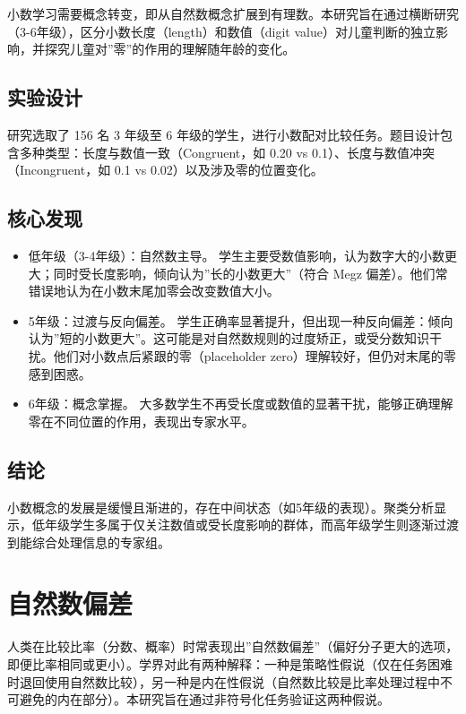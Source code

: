 小数学习需要概念转变，即从自然数概念扩展到有理数。本研究旨在通过横断研究（3-6年级），区分小数长度（length）和数值（digit value）对儿童判断的独立影响，并探究儿童对”零”的作用的理解随年龄的变化。

\subsection{实验设计}

研究选取了 156 名 3 年级至 6 年级的学生，进行小数配对比较任务。题目设计包含多种类型：长度与数值一致（Congruent，如 0.20 vs 0.1）、长度与数值冲突（Incongruent，如 0.1 vs 0.02）以及涉及零的位置变化。

\subsection{核心发现}

\begin{itemize}
    \item 低年级（3-4年级）：自然数主导。 学生主要受数值影响，认为数字大的小数更大；同时受长度影响，倾向认为”长的小数更大”（符合 Megz 偏差）。他们常错误地认为在小数末尾加零会改变数值大小。
    \item 5年级：过渡与反向偏差。 学生正确率显著提升，但出现一种反向偏差：倾向认为”短的小数更大”。这可能是对自然数规则的过度矫正，或受分数知识干扰。他们对小数点后紧跟的零（placeholder zero）理解较好，但仍对末尾的零感到困惑。
    \item 6年级：概念掌握。 大多数学生不再受长度或数值的显著干扰，能够正确理解零在不同位置的作用，表现出专家水平。
\end{itemize}

\subsection{结论}

小数概念的发展是缓慢且渐进的，存在中间状态（如5年级的表现）。聚类分析显示，低年级学生多属于仅关注数值或受长度影响的群体，而高年级学生则逐渐过渡到能综合处理信息的专家组。

\section{自然数偏差}

人类在比较比率（分数、概率）时常表现出”自然数偏差”（偏好分子更大的选项，即便比率相同或更小）。学界对此有两种解释：一种是策略性假说（仅在任务困难时退回使用自然数比较），另一种是内在性假说（自然数比较是比率处理过程中不可避免的内在部分）。本研究旨在通过非符号化任务验证这两种假说。

